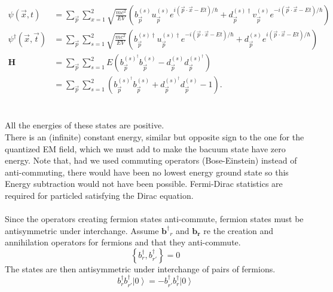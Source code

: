 \documentclass{report}
\begin{document}
\begin{align*}
	\psi\left( \vec{x}, t \right)                 & = \sum_{\vec{p}} \sum_{x = 1}^{2} \sqrt{\frac{mc^2}{EV}} \left( b^{(s)}_{\vec{p}} u^{(s)}_{\vec{p}} e^{i\left( \vec{p} \cdot \vec{x} -Et \right) / \hbar } + d^{(s)\dagger}_{\vec{p}} v^{(s)}_{\vec{p}} e^{-i\left( \vec{p} \cdot \vec{x} -Et \right) / \hbar} \right) \\
	\psi^{\dagger}\left( \vec{x}, \vec{t} \right) & = \sum_{\vec{p}} \sum_{s = 1}^{2} \sqrt{\frac{mc^2}{EV}} \left( b^{(s)\dagger}_{\vec{p}} u^{(s) \dagger}_{\vec{p}} e^{-i\left( \vec{p} \cdot \vec{x} - Et \right) / \hbar} + d^{(s)}_{\vec{p}} e^{i\left( \vec{p} \cdot \vec{x} - Et \right)  / \hbar} \right)         \\
	\mathbf{H}                                    & = \sum_{\vec{p}} \sum_{s=1}^{2} E \left( b^{(s)^{\dagger}}_{\vec{p}} b^{(s)}_{\vec{p}} - d^{(s)}_{\vec{p}} d^{(s)^{\dagger}}_{\vec{p}} \right)                                                                                                                         \\
	                                              & = \sum_{\vec{p}} \sum_{s = 1}^{2} \left( b^{(s)^{\dagger}}_{\vec{p}} b^{(s)}_{\vec{p}} + d^{(s)^{\dagger}}_{\vec{p}} d^{(s)}_{\vec{p}} - 1 \right)
	.\end{align*}
\\
\\
All the energies of these states are positive.
\\
There is an (infinite) constant energy, similar but opposite sign to the one for the quantized EM field, which we must add to make the bacuum state have zero energy. Note that, had we used commuting operators (Bose-Einstein) instead of anti-commuting, there would have been no lowest energy ground state so this Energy subtraction would not have been possible. Fermi-Dirac statistics are required for particled satisfying the Dirac equation.
\\
\\
Since the operators creating fermion states anti-commute, fermion states must be antisymmetric under interchange. Assume $\displaystyle \mathbf{b^{\dagger}}_{r}$ and $\displaystyle \mathbf{b_{r}}$ re the creation and annihilation operators for fermions and that they anti-commute.
\begin{equation}
	\left\{ b^{\dagger}_{r}, b^{\dagger}_{r'} \right\} = 0
\end{equation}
The states are then antisymmetric under interchange of pairs of fermions.
\begin{equation}
	b^{\dagger}_{r}b^{\dagger}_{r'} \left|0\right> = -b^{\dagger}_{r'}b^{\dagger}_{r} \left|0\right>
\end{equation}
\end{document}
